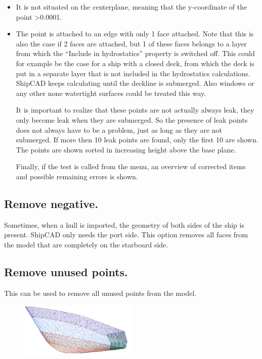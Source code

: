 \documentclass[12pt]{article}
\begin{document}
\begin{itemize}

\item It is not situated on the centerplane, meaning that the
y-coordinate of the point \textgreater 0.0001.

\item The point is attached to an edge with only 1 face attached. Note that this is also the case if
2 faces are attached, but 1 of these faces belongs to a layer from
which the ``Include in hydrostatics'' property is switched off. This
could for example be the case for a ship with a closed deck, from
which the deck is put in a separate layer that is not included in the
hydrostatics calculations. ShipCAD keeps calculating until the
deckline is submerged.  Also windows or any other none watertight
surfaces could be treated this way.

It is important to realize that
these points are not actually always leak, they only become leak when
they are submerged. So the presence of leak points does not always
have to be a problem, just as long as they are not submerged. If more
then 10 leak points are found, only the first 10 are shown.  The
points are shown sorted in increasing height above the base plane.

Finally, if the test is called from the menu, an overview of corrected
items and possible remaining errors is shown.

\end{itemize}

\subsection{Remove negative.}
Sometimes, when a hull is imported, the geometry of both sides of the
ship is present. ShipCAD only needs the port side. This option removes
all faces from the model that are completely on the starboard side.

\subsection{Remove unused points.}
This can be used to remove all unused points from the model.

\begin{figure}
        \centering
        \includegraphics[width=0.5\textwidth,natwidth=585,natheight=273]{developplates.png}
        \caption{}
        \label{fig:developplates}
\end{figure}
\end{document}
